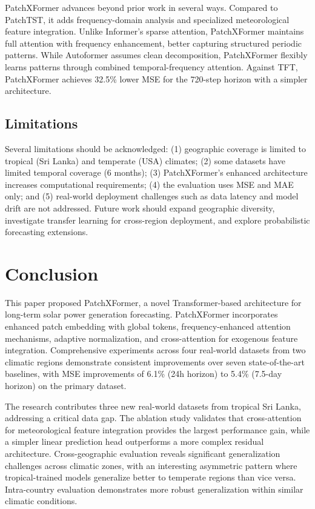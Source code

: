 \documentclass[a4paper,fleqn]{cas-dc}
\begin{document}
PatchXFormer advances beyond prior work in several ways. Compared to PatchTST, it adds frequency-domain analysis and specialized meteorological feature integration. Unlike Informer's sparse attention, PatchXFormer maintains full attention with frequency enhancement, better capturing structured periodic patterns. While Autoformer assumes clean decomposition, PatchXFormer flexibly learns patterns through combined temporal-frequency attention. Against TFT, PatchXFormer achieves 32.5\% lower MSE for the 720-step horizon with a simpler architecture.

\subsection{Limitations}

Several limitations should be acknowledged: (1) geographic coverage is limited to tropical (Sri Lanka) and temperate (USA) climates; (2) some datasets have limited temporal coverage (6 months); (3) PatchXFormer's enhanced architecture increases computational requirements; (4) the evaluation uses MSE and MAE only; and (5) real-world deployment challenges such as data latency and model drift are not addressed. Future work should expand geographic diversity, investigate transfer learning for cross-region deployment, and explore probabilistic forecasting extensions.

\section{Conclusion}\label{sec:conclusion}

This paper proposed PatchXFormer, a novel Transformer-based architecture for long-term solar power generation forecasting. PatchXFormer incorporates enhanced patch embedding with global tokens, frequency-enhanced attention mechanisms, adaptive normalization, and cross-attention for exogenous feature integration. Comprehensive experiments across four real-world datasets from two climatic regions demonstrate consistent improvements over seven state-of-the-art baselines, with MSE improvements of 6.1\% (24h horizon) to 5.4\% (7.5-day horizon) on the primary dataset.

The research contributes three new real-world datasets from tropical Sri Lanka, addressing a critical data gap. The ablation study validates that cross-attention for meteorological feature integration provides the largest performance gain, while a simpler linear prediction head outperforms a more complex residual architecture. Cross-geographic evaluation reveals significant generalization challenges across climatic zones, with an interesting asymmetric pattern where tropical-trained models generalize better to temperate regions than vice versa. Intra-country evaluation demonstrates more robust generalization within similar climatic conditions.
\end{document}
